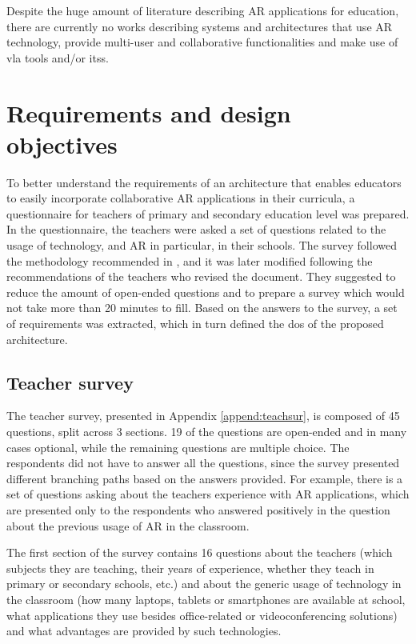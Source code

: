 Despite the huge amount of literature describing AR applications for education, there are currently no works describing systems and architectures that use AR technology, provide multi-user and collaborative functionalities and make use of \gls{vla} tools and/or \glspl{its}.


\section{Requirements and design objectives}\label{arch:requirements}

To better understand the requirements of an architecture that enables educators to easily incorporate collaborative AR applications in their curricula, a questionnaire for teachers of primary and secondary education level was prepared. In the questionnaire, the teachers were asked a set of questions related to the usage of technology, and AR in particular, in their schools. The survey followed the methodology recommended in \citep[Chapter~5]{lazar2017research}, and it was later modified following the recommendations of the teachers who revised the document. They suggested to reduce the amount of open-ended questions and to prepare a survey which would not take more than 20 minutes to fill. Based on the answers to the survey, a set of requirements was extracted, which in turn defined the \glspl{do} of the proposed architecture. 

\subsection{Teacher survey}\label{sec:req:survey}

The teacher survey, presented in Appendix \ref{append:teachsur}, is composed of 45 questions, split across 3 sections. 19 of the questions are open-ended and in many cases optional, while the remaining questions are multiple choice.
The respondents did not have to answer all the questions, since the survey presented different branching paths based on the answers provided. For example, there is a set of questions asking about the teachers experience with AR applications, which are presented only to the respondents who answered positively in the question about the previous usage of AR in the classroom.   

The first section of the survey contains 16 questions about the teachers (which subjects they are teaching, their years of experience, whether they teach in primary or secondary schools, etc.) and about the generic usage of technology in the classroom (how many laptops, tablets or smartphones are available at school, what applications they use besides office-related or videoconferencing solutions) and what advantages are provided by such technologies.

